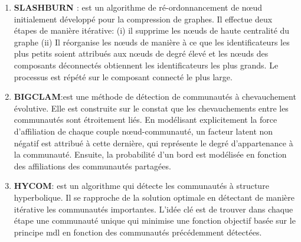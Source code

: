 \begin{enumerate}
				\item \textbf{SLASHBURN \citep{kang2011beyond}}: est un algorithme de ré-ordonnancement de nœud initialement développé pour la compression de graphes. Il effectue deux étapes de manière itérative: (i) il supprime les nœuds de haute centralité du graphe (ii) Il réorganise les nœuds de manière à ce que les identificateurs les plus petits soient attribués aux nœuds de degré élevé et les nœuds des composants déconnectés obtiennent les identificateurs les plus grands. Le processus est répété sur le composant connecté le plus large.
				\item \textbf{BIGCLAM\citep{yang2013overlapping}}:est une méthode de détection de communautés à chevauchement évolutive. Elle est construite sur le constat que les chevauchements entre les communautés sont étroitement liés. En modélisant explicitement la force d’affiliation de chaque couple nœud-communauté, un facteur latent non négatif est attribué à cette dernière, qui représente le degré d'appartenance à la communauté. Ensuite, la probabilité d'un bord est modélisée en fonction des affiliations des communautés partagées.
				\item \textbf{HYCOM\citep{araujo2014beyond}}: est un algorithme qui détecte les communautés à structure hyperbolique. Il se rapproche de la solution optimale en détectant de manière itérative les communautés importantes. L'idée clé est de trouver dans chaque étape une communauté unique qui minimise une fonction objectif basée sur le principe \gls{mdl} en fonction des communautés précédemment détectées. 
				
			\end{enumerate}
			
